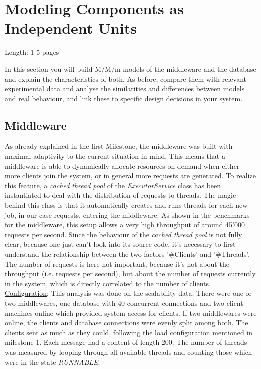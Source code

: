 \documentclass[11pt]{article}
\begin{document}
\section{Modeling Components as Independent Units}\label{sec:independent-units}

Length: 1-5 pages

In this section you will build M/M/m models of the middleware and the database and explain the characteristics of both. As before, compare them with relevant experimental data and analyse the similarities and differences between models and real behaviour, and link these to specific design decisions in your system.

\subsection{Middleware}
As already explained in the first Milestone, the middleware was built with maximal adaptivity to the current situation in mind. This means that a middleware is able to dynamically allocate resources on demand when either more clients join the system, or in general more requests are generated. To realize this feature, a \textit{cached thread pool} of the \textit{ExecutorService} class has been instantiated to deal with the distribution of requests to threads. The magic behind this class is that it automatically creates and runs threads for each new job, in our case requests, entering the middleware. As shown in the benchmarks for the middleware, this setup allows a very high throughput of around 45'000 requests per second. Since the behaviour of the \textit{cached thread pool} is not fully clear, because one just can't look into its source code, it's necessary to first understand the relationship between the two factors '\#Clients' and '\#Threads'. The number of requests is here not important, because it's not about the throughput (i.e. requests per second), but about the number of requests currently in the system, which is directly correlated to the number of clients.
\newline\underline{Configuration}: This analysis was done on the scalability data. There were one or two middlewares, one database with 40 concurrent connections and two client machines online which provided system access for clients. If two middlewares were online, the clients and database connections were evenly split among both. The clients sent as much as they could, following the load configuration mentioned in milestone 1. Each message had a content of length 200. The number of threads was measured by looping through all available threads and counting those which were in the state \textit{RUNNABLE}.
\end{document}
